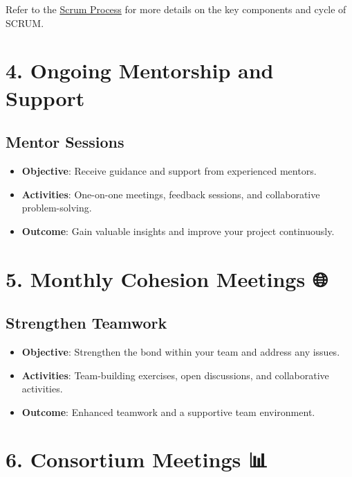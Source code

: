 \documentclass[
  letterpaper,
  DIV=11,
  numbers=noendperiod]{scrreprt}
\providecommand{\tightlist}{%
  \setlength{\itemsep}{0pt}\setlength{\parskip}{0pt}}\usepackage{longtable,booktabs,array}
\begin{document}
Refer to the \href{scrum-process.qmd}{Scrum Process} for more details on
the key components and cycle of SCRUM.

\section{4. Ongoing Mentorship and Support
👨‍🏫👩‍🏫}\label{ongoing-mentorship-and-support}

\subsection{Mentor Sessions 💬}\label{mentor-sessions}

\begin{itemize}
\tightlist
\item
  \textbf{Objective}: Receive guidance and support from experienced
  mentors.
\item
  \textbf{Activities}: One-on-one meetings, feedback sessions, and
  collaborative problem-solving.
\item
  \textbf{Outcome}: Gain valuable insights and improve your project
  continuously.
\end{itemize}

\section{5. Monthly Cohesion Meetings
🌐}\label{monthly-cohesion-meetings}

\subsection{Strengthen Teamwork 🤜🤛}\label{strengthen-teamwork}

\begin{itemize}
\tightlist
\item
  \textbf{Objective}: Strengthen the bond within your team and address
  any issues.
\item
  \textbf{Activities}: Team-building exercises, open discussions, and
  collaborative activities.
\item
  \textbf{Outcome}: Enhanced teamwork and a supportive team environment.
\end{itemize}

\section{6. Consortium Meetings 📊}\label{consortium-meetings}
\end{document}
